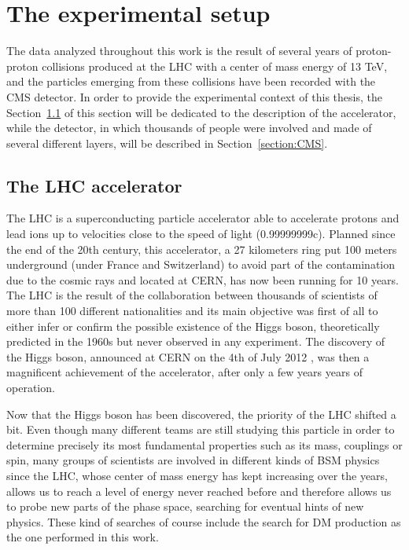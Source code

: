 \documentclass[a4paper, 10pt, openright]{report}
\begin{document}
\chapter{The experimental setup} \label{chapter:Device}

The data analyzed throughout this work is the result of several years of proton-proton collisions produced at the \ac{LHC} with a center of mass energy of 13 TeV, and the particles emerging from these collisions have been recorded with the \ac{CMS} detector. In order to provide the experimental context of this thesis, the Section~\ref{section:LHC} of this section will be dedicated to the description of the accelerator, while the detector, in which thousands of people were involved and made of several different layers, will be described in Section~\ref{section:CMS}.

\section{The \acf{LHC} accelerator} \label{section:LHC}

The \acf{LHC} is a superconducting particle accelerator able to accelerate protons and lead ions up to velocities close to the speed of light (0.99999999c). Planned since the end of the 20th century, this accelerator, a 27 kilometers ring put 100 meters underground (under France and Switzerland) to avoid part of the contamination due to the cosmic rays and located at \ac{CERN}, has now been running for 10 years. The \ac{LHC} is the result of the collaboration between thousands of scientists of more than 100 different nationalities and its main objective was first of all to either infer or confirm the possible existence of the Higgs boson, theoretically predicted in the 1960s \cite{HiggsPostulate1, HiggsPostulate2} but never observed in any experiment. The discovery of the Higgs boson, announced at \ac{CERN} on the 4th of July 2012 \cite{HiggsDiscovery1, HiggsDiscovery2}, was then a magnificent achievement of the accelerator, after only a few years years of operation.

Now that the Higgs boson has been discovered, the priority of the \ac{LHC} shifted a bit. Even though many different teams are still studying this particle in order to determine precisely its most fundamental properties such as its mass, couplings or spin, many groups of scientists are involved in different kinds of \ac{BSM} physics since the \ac{LHC}, whose center of mass energy has kept increasing over the years, allows us to reach a level of energy never reached before and therefore allows us to probe new parts of the phase space, searching for eventual hints of new physics. These kind of searches of course include the search for \ac{DM} production as the one performed in this work. 
\end{document}
